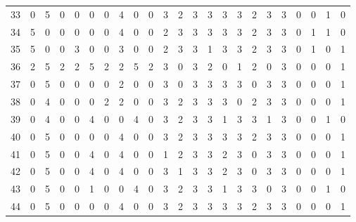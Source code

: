 \begin{table}[htbp]
{\begin{tabular}{lllllllllllllllllllllll}
33                  & 0 & 5 & 0 & 0 & 0 & 0 & 4 & 0 & 0 & 3 & 2 & 3 & 3 & 3 & 3 & 2 & 3 & 3 & 0                  & 0                   & 1                   & 0                   \\
34                  & 5 & 0 & 0 & 0 & 0 & 0 & 4 & 0 & 0 & 2 & 3 & 3 & 3 & 3 & 3 & 2 & 3 & 3 & 0                  & 1                   & 1                   & 0                   \\
35                  & 5 & 0 & 0 & 3 & 0 & 0 & 3 & 0 & 0 & 2 & 3 & 3 & 1 & 3 & 3 & 2 & 3 & 3 & 0                  & 1                   & 0                   & 1                   \\
36                  & 2 & 5 & 2 & 2 & 5 & 2 & 2 & 5 & 2 & 3 & 0 & 3 & 2 & 0 & 1 & 2 & 0 & 3 & 0                  & 0                   & 0                   & 1                   \\
37                  & 0 & 5 & 0 & 0 & 0 & 0 & 2 & 0 & 0 & 3 & 0 & 3 & 3 & 3 & 3 & 0 & 3 & 3 & 0                  & 0                   & 0                   & 1                   \\
38                  & 0 & 4 & 0 & 0 & 0 & 2 & 2 & 0 & 0 & 3 & 2 & 3 & 3 & 3 & 0 & 2 & 3 & 3 & 0                  & 0                   & 0                   & 1                   \\
39                  & 0 & 4 & 0 & 0 & 4 & 0 & 0 & 4 & 0 & 3 & 2 & 3 & 3 & 1 & 3 & 3 & 1 & 3 & 0                  & 0                   & 1                   & 0                   \\
40                  & 0 & 5 & 0 & 0 & 0 & 0 & 4 & 0 & 0 & 3 & 2 & 3 & 3 & 3 & 3 & 2 & 3 & 3 & 0                  & 0                   & 0                   & 1                   \\
41                  & 0 & 5 & 0 & 0 & 4 & 0 & 4 & 0 & 0 & 1 & 2 & 3 & 3 & 2 & 3 & 0 & 3 & 3 & 0                  & 0                   & 0                   & 1                   \\
42                  & 0 & 5 & 0 & 0 & 4 & 0 & 4 & 0 & 0 & 3 & 1 & 3 & 3 & 2 & 3 & 0 & 3 & 3 & 0                  & 0                   & 0                   & 1                   \\
43                  & 0 & 5 & 0 & 0 & 1 & 0 & 0 & 4 & 0 & 3 & 2 & 3 & 3 & 1 & 3 & 3 & 0 & 3 & 0                  & 0                   & 1                   &     0                \\
44                  & 0 & 5 & 0 & 0 & 0 & 0 & 4 & 0 & 0 & 3 & 2 & 3 & 3 & 3 & 3 & 2 & 3 & 3 & 0                  & 0                   & 0                   & 1                   \\

\end{tabular}}
\end{table}
